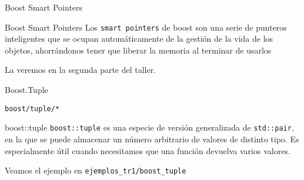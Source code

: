 \documentclass[8pt,xcolor=svgnames]{beamer}
\begin{document}

\begin{frame}{Boost Smart Pointers}
  \begin{block}{Boost Smart Pointers}
    Los \texttt{smart pointers} de boost son una serie de punteros
    inteligentes que se ocupan automáticamente de la gestión de la
    vida de los objetos, ahorrándonos tener que liberar la memoria al
    terminar de usarlos
  \end{block}
  \begin{block}{}
    La veremos en la segunda parte del taller.
  \end{block}  
\end{frame}


\begin{frame}{Boost.Tuple}
  \begin{block}{}
    \texttt{boost/tuple/*}
  \end{block}
  \begin{block}{boost::tuple}
    \texttt{boost::tuple} es una especie de versión generalizada de
    \texttt{std::pair}, en la que se puede almacenar un número
    arbitrario de valores de distinto tipo. Es especialmente útil
    cuando necesitamos que una función devuelva varios valores.
  \end{block}
  \pause
  \begin{block}{}
    Veamos el ejemplo en \texttt{ejemplos\_tr1/boost\_tuple}
  \end{block}  
\end{frame}

\end{document}
